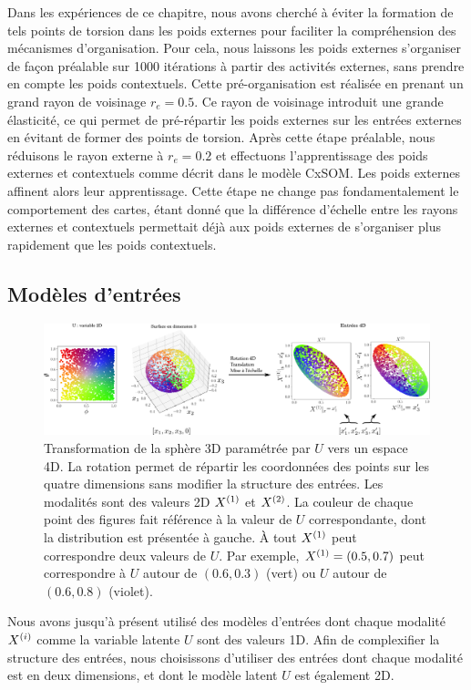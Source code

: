 \documentclass[../main]{subfiles}
\begin{document}
Dans les expériences de ce chapitre, nous avons cherché à éviter la formation de tels points de torsion dans les poids externes pour faciliter la compréhension des mécanismes d'organisation.
Pour cela, nous laissons les poids externes s'organiser de façon préalable sur 1000 itérations à partir des activités externes, sans prendre en compte les poids contextuels. Cette pré-organisation est réalisée en prenant un grand rayon de voisinage $r_e = 0.5$.
Ce rayon de voisinage introduit une grande élasticité, ce qui permet de pré-répartir les poids externes sur les entrées externes en évitant de former des points de torsion. 
Après cette étape préalable, nous réduisons le rayon externe à $r_e = 0.2$ et effectuons l'apprentissage des poids externes et contextuels comme décrit dans le modèle CxSOM. Les poids externes affinent alors leur apprentissage. Cette étape ne change pas fondamentalement le comportement des cartes, étant donné que la différence d'échelle entre les rayons externes et contextuels permettait déjà aux poids externes de s'organiser plus rapidement que les poids contextuels.

\subsection{Modèles d'entrées}
\begin{figure}
	\includegraphics[width=\textwidth]{sphere_inputs_colormap.png}
	\caption{Transformation de la sphère 3D paramétrée par $U$ vers un espace 4D. La rotation permet de répartir les coordonnées des points sur les quatre dimensions sans modifier la structure des entrées. Les modalités sont des valeurs 2D $X^{({1})}$ et $X^{({2})}$.
	La couleur de chaque point des figures fait référence à la valeur de $U$ correspondante, dont la distribution est présentée à gauche. \`A tout $X^{({1})}$ peut correspondre deux valeurs de $U$. Par exemple, $X^{({1})} = (0.5, 0.7)$ peut correspondre à $U$ autour de $(0.6,0.3)$ (vert) ou $U$ autour de $ (0.6,0.8)$ (violet).
	\label{fig:sphere_inputs}}
\end{figure}

Nous avons jusqu'à présent utilisé des modèles d'entrées dont chaque modalité $X^{({i})}$ comme la variable latente $U$ sont des valeurs 1D.
Afin de complexifier la structure des entrées, nous choisissons d'utiliser des entrées dont chaque modalité est en deux dimensions, et dont le modèle latent $U$ est également 2D.
\end{document}
